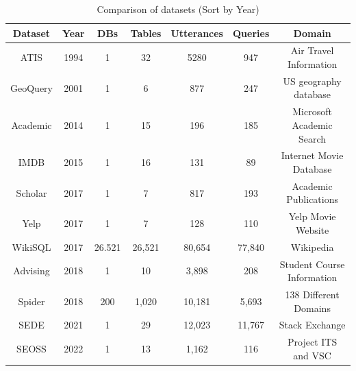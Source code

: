 \begin{table}[!ht]
    \centering
    \begin{tabular}{|c|c|c|c|c|c|c|}
        \hline
        \textbf{Dataset} & \textbf{Year} & \textbf{DBs} & \textbf{Tables} & \textbf{Utterances} & \textbf{Queries} & \textbf{Domain}            \\ \hline
        ATIS             & 1994          & 1            & 32              & 5280                & 947              & Air Travel Information     \\ \hline
        GeoQuery         & 2001          & 1            & 6               & 877                 & 247              & US geography database      \\ \hline
        Academic         & 2014          & 1            & 15              & 196                 & 185              & Microsoft Academic Search  \\ \hline
        IMDB             & 2015          & 1            & 16              & 131                 & 89               & Internet Movie Database    \\ \hline
        Scholar          & 2017          & 1            & 7               & 817                 & 193              & Academic Publications      \\ \hline
        Yelp             & 2017          & 1            & 7               & 128                 & 110              & Yelp Movie Website         \\ \hline
        WikiSQL          & 2017          & 26.521       & 26,521          & 80,654              & 77,840           & Wikipedia                  \\ \hline
        Advising         & 2018          & 1            & 10              & 3,898               & 208              & Student Course Information \\ \hline
        Spider           & 2018          & 200          & 1,020           & 10,181              & 5,693            & 138 Different Domains      \\ \hline
        SEDE             & 2021          & 1            & 29              & 12,023              & 11,767           & Stack Exchange             \\ \hline
        SEOSS            & 2022          & 1            & 13              & 1,162               & 116              & Project ITS and VSC        \\ \hline
    \end{tabular}
    \caption{Comparison of datasets (Sort by Year)}
    \label{tab:datasets}
\end{table}
